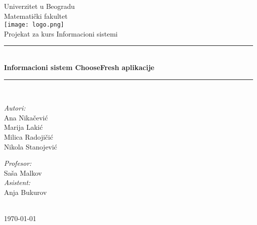 \begin{titlepage}


\newcommand{\HRule}{\rule{\linewidth}{0.5mm}}
\center
\textup{\Large Univerzitet u Beogradu\\Matemati\v cki fakultet}\\[1.5cm]
\texttt{[image: logo.png]}\\[1cm]
\textup{\Large Projekat za kurs Informacioni sistemi}\\[0.4cm]

\HRule \\[0.4cm]
{ \huge \bfseries Informacioni sistem ChooseFresh aplikacije}\\[0.4cm]
\HRule \\[4.5cm]

\begin{minipage}{0.4\textwidth}
\begin{flushleft}
\large
\emph{Autori:}\\
\textup Ana Nikačević\\
\textup Marija Lakić\\
\textup Milica Radojičić\\
\textup Nikola Stanojević\\

\end{flushleft}
\end{minipage}
\hfill
\begin{minipage}{0.4\textwidth}
\begin{flushright}
\large
\emph{Profesor:} \\
\textup Saša Malkov\\
\emph{Asistent:} \\
\textup Anja Bukurov\\
\end{flushright}
\end{minipage}\\[2cm]

{\textup \large \today}\\[1cm]

\end{titlepage}
